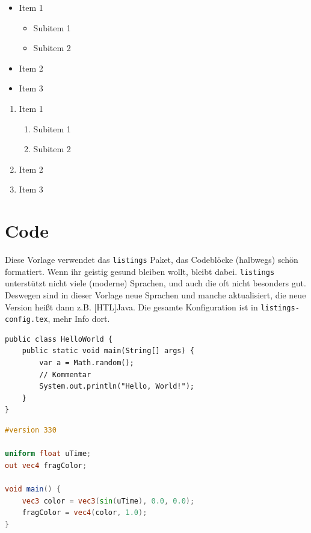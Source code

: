 \begin{itemize}
    \item Item 1
    \begin{itemize}
        \item Subitem 1
        \item Subitem 2
    \end{itemize}
    \item Item 2
    \item Item 3
\end{itemize}

\begin{enumerate}
    \item Item 1
    \begin{enumerate}
        \item Subitem 1
        \item Subitem 2
    \end{enumerate}
    \item Item 2
    \item Item 3
\end{enumerate}

\section{Code}

Diese Vorlage verwendet das \verb|listings| Paket, das Codeblöcke (halbwegs) schön formatiert. Wenn ihr geistig gesund bleiben wollt, bleibt dabei. \@\verb|listings| unterstützt nicht viele (moderne) Sprachen, und auch die oft nicht besonders gut. Deswegen sind in dieser Vorlage neue Sprachen und manche aktualisiert, die neue Version heißt dann z.B. [HTL]Java. Die gesamte Konfiguration ist in \verb|listings-config.tex|, mehr Info dort.

\begin{lstlisting}[language={[HTL]Java}, caption={Beispielcode in Java}]
public class HelloWorld {
    public static void main(String[] args) {
        var a = Math.random();
        // Kommentar
        System.out.println("Hello, World!");
    }
}
\end{lstlisting}

\begin{lstlisting}[language=GLSL, caption={Beispielcode in GLSL}]
#version 330

uniform float uTime;
out vec4 fragColor;

void main() {
    vec3 color = vec3(sin(uTime), 0.0, 0.0);
    fragColor = vec4(color, 1.0);
}
\end{lstlisting}

